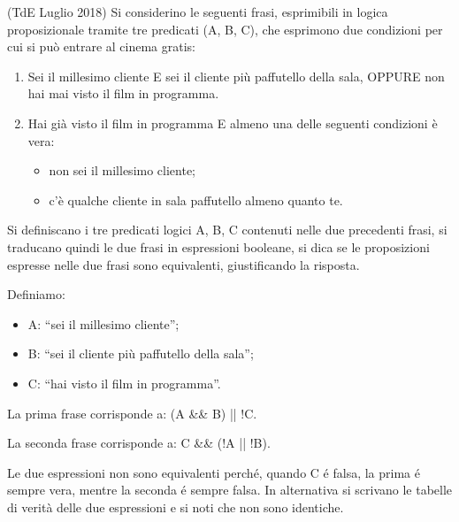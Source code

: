 \begin{Exercise}[label={ex:cinema}]

(TdE Luglio 2018) Si considerino le seguenti frasi, esprimibili in logica proposizionale tramite tre predicati (A, B, C), che esprimono due condizioni per cui si pu\`o entrare al cinema gratis:

\begin{enumerate}
	\item Sei il millesimo cliente E sei il cliente pi\`u paffutello della sala, OPPURE non hai mai visto il film in programma.
	\item Hai gi\`a visto il film in programma E almeno una delle seguenti condizioni \`e vera:
\begin{itemize}
	\item non sei il millesimo cliente;
	\item c'\`e qualche cliente in sala paffutello almeno quanto te.
\end{itemize}
\end{enumerate}

Si definiscano i tre predicati logici A, B, C contenuti nelle due precedenti frasi, si traducano quindi le due frasi in espressioni booleane, si dica se le proposizioni espresse nelle due frasi sono equivalenti, giustificando la risposta.		
		
\end{Exercise}

\begin{Answer}[ref={ex:cinema}]

	Definiamo:
	\begin{itemize}
		\item A:  ``sei il millesimo cliente'';
		\item B: ``sei il cliente pi\`u paffutello della sala'';
		\item C: ``hai visto il film in programma''.
	\end{itemize}
	
	La prima frase corrisponde a: (A \&\& B) || !C.
	
	La seconda frase corrisponde a: C \&\& (!A || !B).
	
	Le due espressioni non sono equivalenti perch\'e, quando C \'e falsa, la prima \'e sempre vera, mentre la seconda \'e sempre falsa. In alternativa si scrivano le tabelle di verit\`a delle due espressioni e si noti che non sono identiche.

\end{Answer}